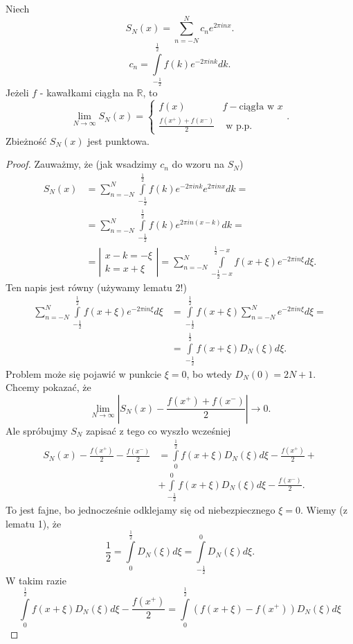 \documentclass[../main.tex]{subfiles}
\begin{document}
\pagebreak
\begin{tw}
    Niech
    \[
        S_N(x) = \sum_{n=-N}^{N} c_n e^{2\pi i n x}
    .\]
\[
    c_n = \int\limits_{-\frac{1}{2}}^{\frac{1}{2}} f(k) e^{-2\pi i nk}dk
.\]
Jeżeli $f$ - kawałkami ciągła na $\mathbb{R}$, to
\[
    \lim_{N \to \infty}S_N(x) = \begin{cases}
        f(x) & f - \text{ciągła w }x\\
        \frac{f(x^+) + f(x^-)}{2}& \text{ w p.p.}
    \end{cases}
.\]
Zbieżność $S_N(x)$ jest punktowa.
\end{tw}
\begin{proof}
    Zauważmy, że (jak wsadzimy $c_n$ do wzoru na $S_N$)
    \begin{align*}
        S_N(x) &= \sum_{n=-N}^{N} \int\limits_{-\frac{1}{2}}^{\frac{1}{2}} f(k)e^{-2\pi i n k}e^{2\pi i n x}dk = \\
        &= \sum_{n=-N}^{N} \int\limits_{-\frac{1}{2}}^{\frac{1}{2}} f(k)e^{2\pi i n(x-k)}dk = \\
        &= \left| \begin{matrix} x - k = -\xi\\
        k = x + \xi \end{matrix}  \right| = \sum_{n=-N}^{N} \int\limits_{-\frac{1}{2} - x}^{\frac{1}{2} - x} f(x+\xi)e^{-2\pi i n \xi} d\xi
    .\end{align*}
    Ten napis jest równy (używamy lematu 2!)
    \begin{align*}
        \sum_{n=-N}^{N} \int\limits_{-\frac{1}{2}}^{\frac{1}{2}} f(x+\xi)e^{-2\pi i n \xi} d\xi &= \int\limits_{-\frac{1}{2}}^{\frac{1}{2}} f(x+\xi) \sum_{n=-N}^{N} e^{-2\pi i n \xi}d\xi =\\
        &= \int\limits_{-\frac{1}{2}}^{\frac{1}{2}} f(x+\xi)D_N(\xi)d\xi
    .\end{align*}
    Problem może się pojawić w punkcie $\xi = 0$, bo wtedy $D_N(0) = 2N + 1$.\\
    Chcemy pokazać, że
    \[
        \lim_{N \to \infty}\left| S_N(x) - \frac{f(x^+) + f(x^-)}{2} \right| \to 0
    .\]
Ale spróbujmy $S_N$ zapisać z tego co wyszło wcześniej
\begin{align*}
    S_N(x) - \frac{f(x^+)}{2} - \frac{f(x^-)}{2} &= \int\limits_{0}^{\frac{1}{2}} f(x+\xi)D_N(\xi)d\xi - \frac{f(x^+)}{2} + \\
    &+ \int\limits_{-\frac{1}{2}}^{0} f(x+\xi)D_N(\xi)d\xi - \frac{f(x^-)}{2}
.\end{align*}
    To jest fajne, bo jednocześnie odklejamy się od niebezpiecznego $\xi = 0$. Wiemy (z lematu 1), że
    \[
        \frac{1}{2} = \int\limits_{0}^{\frac{1}{2}} D_N(\xi)d\xi = \int\limits_{-\frac{1}{2}}^{0} D_N(\xi)d\xi
    .\]
W takim razie
\begin{equation}
    \label{eqn:s1}
    \int\limits_{0}^{\frac{1}{2}} f(x+\xi)D_N(\xi)d\xi - \frac{f(x^+)}{2} = \int\limits_{0}^{\frac{1}{2}} \left(f(x+\xi) - f(x^+)\right) D_N(\xi)d\xi \tag{$OO$}
\end{equation}


\end{proof}
\end{document}
